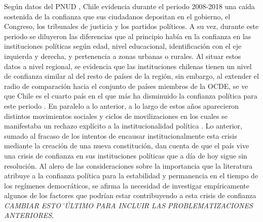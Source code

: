\documentclass[12pt,twoside]{templates/facsothesis}
\begin{document}
Según datos del PNUD \citeyearpar{pnudDiezAnosAuditoria2019}, Chile evidencia durante el periodo 2008-2018 una caída sostenida de la confianza que sus ciudadanos depositan en el gobierno, el Congreso, los tribunales de justicia y los partidos políticos. A su vez, durante este periodo se diluyeron las diferencias que al principio había en la confianza en las instituciones políticas según edad, nivel educacional, identificación con el eje izquierda y derecha, y pertenencia a zonas urbanas o rurales. Al situar estos datos a nivel regional, se evidencia que las instituciones chilenas tienen un nivel de confianza similar al del resto de países de la región, sin embargo, al extender el radio de comparación hacia el conjunto de países miembros de la OCDE, se ve que Chile es el cuarto país en el que más ha disminuido la confianza política para este periodo \citep{pnudDiezAnosAuditoria2019}. En paralelo a lo anterior, a lo largo de estos años aparecieron distintos movimientos sociales y ciclos de movilizaciones en los cuales se manifestaba un rechazo explícito a la institucionalidad política \citep{avendanoPropuestasCambioDebilidad2021, barozetEntreUrnaRedes2016}. Lo anterior, sumado al fracaso de los intentos de encausar institucionalmente esta crisis mediante la creación de una nueva constitución, dan cuenta de que el país vive una crisis de confianza en sus instituciones políticas que a día de hoy sigue sin resolución. Al alero de las consideraciones sobre la importancia que la literatura atribuye a la confianza política para la estabilidad y permanencia en el tiempo de los regímenes democráticos, se afirma la necesidad de investigar empíricamente algunos de los factores que podrían estar contribuyendo a esta crisis de confianza \emph{CAMBIAR ESTO¨ÚLTIMO PARA INCLUIR LAS PROBLEMATIZACIONES ANTERIORES}.
\end{document}
